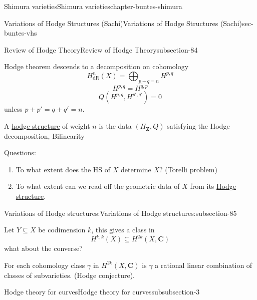 \documentclass[oneside,10pt,]{book}
\numberwithin{equation}{section}
\newcommand{\ZZ}{\mathbf{Z}}
\newcommand{\CC}{\mathbf{C}}
\newcommand{\dR}{\mathrm{dR}}
\begin{document}
\begin{chapterptx}{Shimura varieties}{}{Shimura varieties}{}{}{chapter-buntes-shimura}
\begin{sectionptx}{Variations of Hodge Structures (Sachi)}{}{Variations of Hodge Structures (Sachi)}{}{}{sec-buntes-vhs}
\begin{subsectionptx}{Review of Hodge Theory}{}{Review of Hodge Theory}{}{}{subsection-84}
\par
\hypertarget{p-1153}{}%
Hodge theorem descends to a decomposition on cohomology%
\begin{equation*}
H^n_\dR(X) = \bigoplus_{p+q = n} H^{p,q}
\end{equation*}
%
\begin{equation*}
H^{p,q} = \overline{H^{q,p}}
\end{equation*}
%
\begin{equation*}
Q(H^{p,q}, H^{p',q'}) = 0
\end{equation*}
unless \(p+p' = q+q' = n\).%
\par
\hypertarget{p-1154}{}%
A \hyperref[def-hodge-str]{hodge structure} of weight \(n\) is the data \((H_\ZZ, Q)\) satisfying the Hodge decomposition, Bilinearity%
\par
\hypertarget{p-1155}{}%
Questions:\leavevmode%
\begin{enumerate}
\item\hypertarget{li-288}{}To what extent does the HS of \(X\) determine \(X\)? (Torelli problem)%
\item\hypertarget{li-289}{}To what extent can we read off the geometric data of \(X\) from its \hyperref[def-hodge-str]{Hodge structure}.%
\end{enumerate}
%
\end{subsectionptx}
%
%
\typeout{************************************************}
\typeout{************************************************}
%
\begin{subsectionptx}{Variations of Hodge structures:}{}{Variations of Hodge structures:}{}{}{subsection-85}
\begin{introduction}{}%
\hypertarget{p-1156}{}%
Let \(Y \subseteq X\) be codimension \(k\), this gives a class in%
\begin{equation*}
H^{k,k}(X) \subseteq H^{2k}(X,\CC)
\end{equation*}
what about the converse?%
\par
\hypertarget{p-1157}{}%
For each cohomology class \(\gamma\)  in \(H^{2k} (X,\CC)\) is \(\gamma\) a rational linear combination of classes of subvarieties. (Hodge conjecture).%
\end{introduction}%
%
%
\typeout{************************************************}
\typeout{************************************************}
%
\begin{subsubsectionptx}{Hodge theory for curves}{}{Hodge theory for curves}{}{}{subsubsection-3}

\end{subsubsectionptx}
\end{subsectionptx}
\end{sectionptx}
\end{chapterptx}
\end{document}
